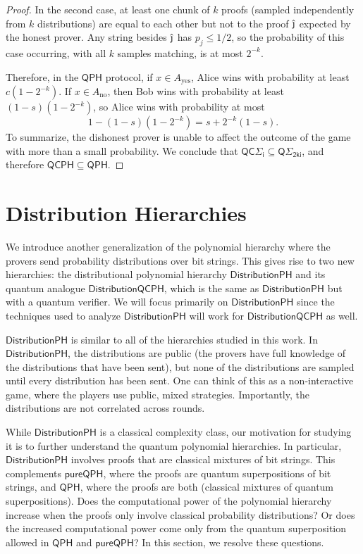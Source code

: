 \documentclass[11pt]{article}
\theoremstyle{definition}
\newcommand{\yes}{\text{yes}}
\newcommand{\no}{\text{no}}
\newcommand{\class}[1]{\ensuremath{\mathsf{#1}}\xspace}
\newcommand{\QCPH}{\class{QCPH}}
\newcommand{\QCSigmai}[1][i]{\class{QC\Sigma_{#1}}}
\newcommand{\QPH}{\class{QPH}}
\newcommand{\QSigmai}[1][i]{\class{Q\Sigma_{#1}}}
\newcommand{\pureQPH}{\class{pureQPH}}
\newcommand{\distributionPH}{\mixedPH}
\newcommand{\distributionQCPH}{\mathsf{DistributionQCPH}}
\newcommand{\mixedPH}{\class{DistributionPH}}
\begin{document}
\begin{proof}
    In the second case, at least one chunk of $k$ proofs (sampled independently from $k$ distributions) 
    are equal to each other but not to the proof $\hat{\text{\j}}$ expected by the honest prover. 
    Any string besides $\hat{\text{\j}}$ has $p_j \leq 1/2$,
    so the probability of this case occurring, with all $k$ samples matching, is at most $2^{-k}$. 
    
    Therefore, in the $\QPH$ protocol, if $x \in A_\yes$, Alice wins with probability at least $c\left(1 -2^{-k}\right)$. If $x \in A_\no$, then Bob wins with probability at least $(1-s)\left(1-2^{-k}\right)$, so Alice wins with probability at most 
    \[
    1 - (1-s)\left(1-2^{-k}\right) = s + 2^{-k}(1 - s).
    \]
    To summarize, the dishonest prover is unable to affect the outcome of the game with more than a small probability. 
    We conclude that $\QCSigmai \subseteq \QSigmai[2ki]$, and therefore $\QCPH\subseteq \QPH$. 
\end{proof}


\section{Distribution Hierarchies}\label{sec:mixed}

We introduce another generalization of the polynomial hierarchy where the provers send probability distributions over bit strings. 
This gives rise to two new hierarchies: the distributional polynomial hierarchy $\distributionPH$ and its quantum analogue $\distributionQCPH$, which is the same as $\distributionPH$ but with a quantum verifier.
We will focus primarily on $\distributionPH$ since the techniques used to analyze $\distributionPH$ will work for $\distributionQCPH$ as well.








$\mixedPH$ is similar to all of the hierarchies studied in this work.
In $\mixedPH$, the distributions are public (the provers have full knowledge of the distributions that have been sent), but none of the distributions are sampled until every distribution has been sent.
One can think of this as a non-interactive game, where the players use public, mixed strategies. 
Importantly, the distributions are not correlated across rounds. 

While $\mixedPH$ is a classical complexity class, our motivation for studying it is to further understand the quantum polynomial hierarchies. 
In particular, $\mixedPH$ involves proofs that are classical mixtures of bit strings. 
This complements $\pureQPH$, where the proofs are quantum superpositions of bit strings, and $\QPH$, where the proofs are both (classical mixtures of quantum superpositions).
Does the computational power of the polynomial hierarchy increase when the proofs only involve classical probability distributions? Or does the increased computational power come only from the quantum superposition allowed in $\QPH$ and $\pureQPH$?
In this section, we resolve these questions. 
\end{document}
